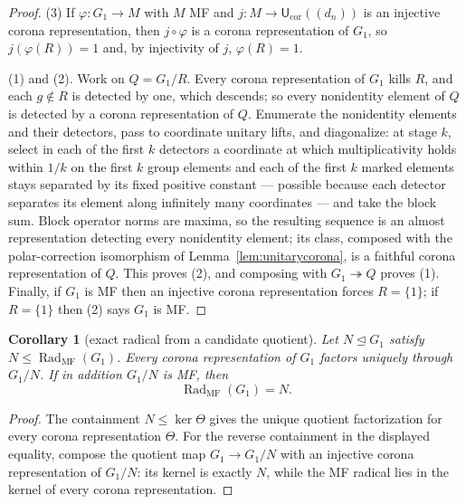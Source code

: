 \documentclass[11pt]{amsart}
\newcommand{\leanverified}[2]{\ignorespaces}
\newtheorem{corollary}[theorem]{Corollary}
\theoremstyle{definition}
\theoremstyle{remark}
\theoremstyle{plain}
\newcommand{\Ucor}{\mathsf U_{\mathrm{cor}}}
\begin{document}
\begin{proof}
(3) If $\varphi\colon G_1\to M$ with $M$ MF and
$j\colon M\to\Ucor((d_n))$ is an injective corona representation,
then $j\circ\varphi$ is a corona representation of $G_1$, so
$j(\varphi(R))=1$ and, by injectivity of $j$, $\varphi(R)=1$.

(1) and (2).  Work on $Q=G_1/R$.  Every corona representation of
$G_1$ kills $R$, and each $g\notin R$ is detected by one, which
descends; so every nonidentity element of $Q$ is detected by a corona
representation of $Q$.  Enumerate the nonidentity elements and their
detectors, pass to coordinate unitary lifts, and diagonalize: at stage
$k$, select in each of the first $k$ detectors a coordinate at which
multiplicativity holds within $1/k$ on the first $k$ group elements
and each of the first $k$ marked elements stays separated by its fixed
positive constant --- possible because each detector separates its
element along infinitely many coordinates --- and take the block sum.  Block
operator norms are maxima, so the resulting sequence is an almost
representation detecting every nonidentity element; its class,
composed with the polar-correction isomorphism of
Lemma~\ref{lem:unitarycorona}, is a faithful corona representation of
$Q$.  This proves (2), and composing with
$G_1\twoheadrightarrow Q$ proves (1).  Finally, if $G_1$ is MF then an
injective corona representation forces $R=\{1\}$; if $R=\{1\}$ then
(2) says $G_1$ is MF.
\end{proof}

\begin{corollary}[exact radical from a candidate quotient]\label{cor:exactradical}
Let $N\trianglelefteq G_1$ satisfy
$N\le\operatorname{Rad}_{\mathrm{MF}}(G_1)$.  Every corona
representation of $G_1$ factors uniquely through $G_1/N$.  If in
addition $G_1/N$ is MF, then
\leanverified{Sofic/ManuscriptExactWrappers}{GroupApproximation.ManuscriptExactWrappers.manuscriptExactRadicalFromCandidateQuotient}
\[
 \operatorname{Rad}_{\mathrm{MF}}(G_1)=N.
\]
\end{corollary}

\begin{proof}
The containment $N\le\ker\Theta$ gives the unique quotient
factorization for every corona representation $\Theta$.  For the
reverse containment in the displayed equality, compose the quotient
map $G_1\to G_1/N$ with an injective corona representation of $G_1/N$:
its kernel is exactly $N$, while the MF radical lies in the kernel of
every corona representation.
\end{proof}
\end{document}
